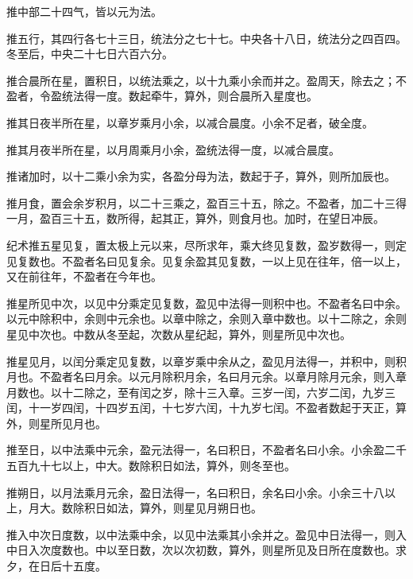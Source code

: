 \documentclass[12pt,UTF8]{ctexbook}
\begin{document}
推中部二十四气，皆以元为法。



推五行，其四行各七十三日，统法分之七十七。中央各十八日，统法分之四百四。冬至后，中央二十七日六百六分。



推合晨所在星，置积日，以统法乘之，以十九乘小余而并之。盈周天，除去之；不盈者，令盈统法得一度。数起牵牛，算外，则合晨所入星度也。



推其日夜半所在星，以章岁乘月小余，以减合晨度。小余不足者，破全度。



推其月夜半所在星，以月周乘月小余，盈统法得一度，以减合晨度。



推诸加时，以十二乘小余为实，各盈分母为法，数起于子，算外，则所加辰也。



推月食，置会余岁积月，以二十三乘之，盈百三十五，除之。不盈者，加二十三得一月，盈百三十五，数所得，起其正，算外，则食月也。加时，在望日冲辰。



纪术推五星见复，置太极上元以来，尽所求年，乘大终见复数，盈岁数得一，则定见复数也。不盈者名曰见复余。见复余盈其见复数，一以上见在往年，倍一以上，又在前往年，不盈者在今年也。



推星所见中次，以见中分乘定见复数，盈见中法得一则积中也。不盈者名曰中余。以元中除积中，余则中元余也。以章中除之，余则入章中数也。以十二除之，余则星见中次也。中数从冬至起，次数从星纪起，算外，则星所见中次也。



推星见月，以闰分乘定见复数，以章岁乘中余从之，盈见月法得一，并积中，则积月也。不盈者名曰月余。以元月除积月余，名曰月元余。以章月除月元余，则入章月数也。以十二除之，至有闰之岁，除十三入章。三岁一闰，六岁二闰，九岁三闰，十一岁四闰，十四岁五闰，十七岁六闰，十九岁七闰。不盈者数起于天正，算外，则星所见月也。



推至日，以中法乘中元余，盈元法得一，名曰积日，不盈者名曰小余。小余盈二千五百九十七以上，中大。数除积日如法，算外，则冬至也。



推朔日，以月法乘月元余，盈日法得一，名曰积日，余名曰小余。小余三十八以上，月大。数除积日如法，算外，则星见月朔日也。



推入中次日度数，以中法乘中余，以见中法乘其小余并之。盈见中日法得一，则入中日入次度数也。中以至日数，次以次初数，算外，则星所见及日所在度数也。求夕，在日后十五度。
\end{document}
